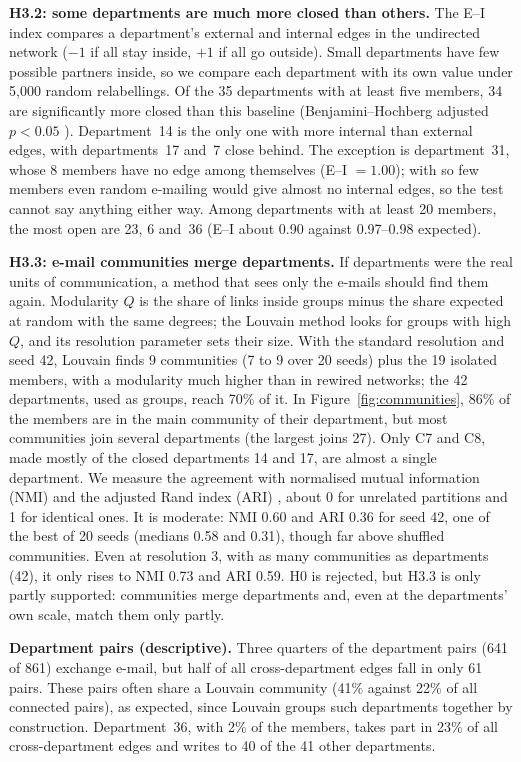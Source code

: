 \documentclass[12pt, a4paper]{article}
\begin{document}
\textbf{H3.2: some departments are much more closed than others.} The E--I
index \cite{krackhardtstern1988} compares a department's external and internal
edges in the undirected network ($-1$ if all stay inside, $+1$ if all go
outside). Small departments have few possible partners inside, so we compare
each department with its own value under 5{,}000 random relabellings. Of the
35 departments with at least five members, 34 are significantly more closed
than this baseline (Benjamini--Hochberg adjusted $p<0.05$
\cite{benjamini1995}). Department~14 is the only one with more internal than
external edges, with departments~17 and~7 close behind. The exception is
department~31, whose 8 members have no edge among themselves (E--I $=1.00$);
with so few members even random e-mailing would give almost no internal edges,
so the test cannot say anything either way. Among departments with at least 20
members, the most open are 23, 6 and~36 (E--I about 0.90 against 0.97--0.98
expected).

\textbf{H3.3: e-mail communities merge departments.} If departments were the
real units of communication, a method that sees only the e-mails should find
them again. Modularity $Q$ is the share of links inside groups minus the share
expected at random with the same degrees; the Louvain method
\cite{blondel2008} looks for groups with high $Q$, and its resolution parameter
sets their size. With the standard resolution and seed 42, Louvain finds 9
communities (7 to 9 over 20 seeds) plus the 19 isolated members, with a
modularity much higher than in rewired networks; the 42 departments, used as
groups, reach 70\% of it. In Figure~\ref{fig:communities}, 86\% of the members
are in the main community of their department, but most communities join
several departments (the largest joins 27). Only C7 and C8, made mostly of the
closed departments 14 and 17, are almost a single department. We measure the
agreement with normalised mutual information (NMI) and the adjusted Rand index
(ARI) \cite{danon2005,hubert1985}, about 0 for unrelated partitions and 1 for
identical ones. It is moderate: NMI 0.60 and ARI 0.36 for seed 42, one of the
best of 20 seeds (medians 0.58 and 0.31), though far above shuffled
communities. Even at resolution 3, with as many communities as departments
(42), it only rises to NMI 0.73 and ARI 0.59. H0 is rejected, but H3.3 is only
partly supported: communities merge departments and, even at the departments'
own scale, match them only partly.

\textbf{Department pairs (descriptive).} Three quarters of the department pairs
(641 of 861) exchange e-mail, but half of all cross-department edges fall in
only 61 pairs. These pairs often share a Louvain community (41\% against 22\%
of all connected pairs), as expected, since Louvain groups such departments
together by construction. Department~36, with 2\% of the members, takes part in
23\% of all cross-department edges and writes to 40 of the 41 other
departments.
\end{document}
